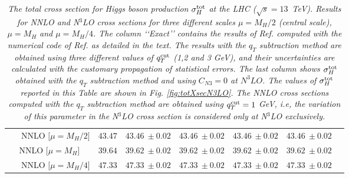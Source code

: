\documentclass[12pt]{article}
\def\qt{q_T}
\begin{document}
\begin{table}
{\begin{tabular}{ |c||c|c|c|c|c|c| }
\hline

\multirow{1}{*}{~~~NNLO  {\scriptsize$\big[\mu=M_{H}/2\big]$} } 

& $43.47$%

& $43.46~\pm 0.02$

& $43.46~\pm 0.02$

& $43.46~\pm 0.02$ 

& $43.46~\pm 0.02$  \\

\multirow{1}{*}{NNLO  {\scriptsize$\big[\mu=M_{H}\big]$} } 

& $39.64$%

& $39.62~\pm 0.02$ 

& $39.62~\pm 0.02$ 

& $39.62~\pm 0.02$ 

& $39.62~\pm 0.02$ \\

\multirow{1}{*}{~~~NNLO  {\scriptsize$\big[\mu=M_{H}/4\big]$} } 

& $47.33$%

& $47.33~\pm 0.02$  

& $47.33~\pm 0.02$

& $47.33~\pm 0.02$  

& $47.33~\pm 0.02$ \\

\hline

\end{tabular}
}
\caption{\label{Table:totXsec}
{\em The total cross section for Higgs boson production $\sigma_{H}^{{\rm {tot}}}$ at the LHC ($\sqrt{s}=13$~TeV). Results for NNLO and N$^{3}$LO cross sections for three different scales $\mu=M_{H}/2$ (central scale), $\mu=M_{H}$ and $\mu=M_{H}/4$. The column \lq{}\lq{}Exact\rq{}\rq{} contains the results of Ref. \cite{Mistlberger:2018etf} computed with the numerical code of Ref. \cite{Dulat:2018rbf} as detailed in the text. The results with the $\qt$ subtraction method are obtained using three different values of $\qt^{{\rm cut}}$ (1,2 and 3 GeV), and their uncertainties are calculated with the customary propagation of statistical errors. The last column shows $ \sigma_{H}^{{\rm {tot}}}$ obtained with the $\qt$ subtraction method and using $C_{N3}=0$ at $N^{3}LO$. The values of $ \sigma_{H}^{{\rm {tot}}}$ reported in this Table are shown in Fig. \ref{fig:totXsecN3LO}. The NNLO cross sections computed with the $\qt$ subtraction method are obtained using $\qt^{{\rm cut}}=1$ GeV, i.e, the variation of this parameter in the N$^{3}$LO cross section is considered only at N$^{3}$LO exclusively.
}
}

\end{table}
\end{document}
